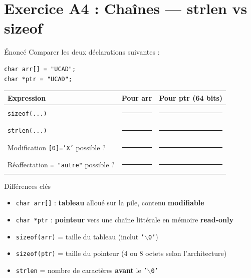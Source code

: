 \documentclass[10pt,a4paper]{article}
\begin{document}
\newpage
\section{Exercice A4 : Chaînes — strlen vs sizeof}

\begin{exercicebox}{Énoncé}
Comparer les deux déclarations suivantes :
\begin{lstlisting}
char arr[] = "UCAD";
char *ptr = "UCAD";
\end{lstlisting}
\end{exercicebox}

\vspace{0.5em}

\begin{center}
\renewcommand{\arraystretch}{1.5}
\begin{tabular}{|l|c|c|}
\hline
\textbf{Expression} & \textbf{Pour arr} & \textbf{Pour ptr (64 bits)} \\
\hline
\texttt{sizeof(...)} & \rule{2cm}{0.4pt} & \rule{2cm}{0.4pt} \\
\hline
\texttt{strlen(...)} & \rule{2cm}{0.4pt} & \rule{2cm}{0.4pt} \\
\hline
Modification \texttt{[0]='X'} possible ? & \rule{2cm}{0.4pt} & \rule{2cm}{0.4pt} \\
\hline
Réaffectation \texttt{= "autre"} possible ? & \rule{2cm}{0.4pt} & \rule{2cm}{0.4pt} \\
\hline
\end{tabular}
\end{center}

\begin{examplebox}{Différences clés}
\begin{itemize}
    \item \texttt{char arr[]} : \textbf{tableau} alloué sur la pile, contenu \textbf{modifiable}
    \item \texttt{char *ptr} : \textbf{pointeur} vers une chaîne littérale en mémoire \textbf{read-only}
    \item \texttt{sizeof(arr)} = taille du tableau (inclut \texttt{'$\backslash$0'})
    \item \texttt{sizeof(ptr)} = taille du pointeur (4 ou 8 octets selon l'architecture)
    \item \texttt{strlen} = nombre de caractères \textbf{avant} le \texttt{'$\backslash$0'}
\end{itemize}
\end{examplebox}
\end{document}
